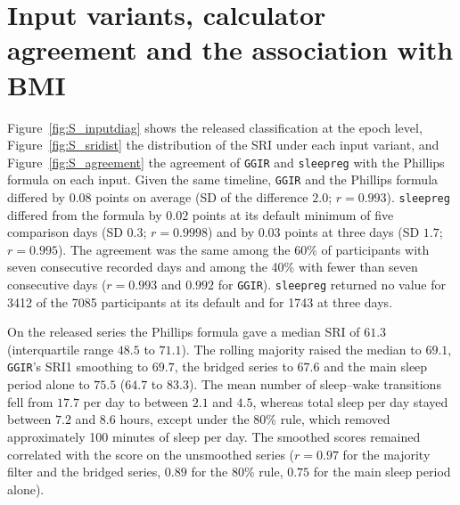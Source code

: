 \documentclass[12pt]{article}
\begin{document}
\section{Input variants, calculator agreement and the association with BMI}
\label{sec:S_inputs}
Figure~\ref{fig:S_inputdiag} shows the released classification at the epoch level, Figure~\ref{fig:S_sridist} the distribution of the SRI under each input variant, and Figure~\ref{fig:S_agreement} the agreement of \texttt{GGIR} and \texttt{sleepreg} with the Phillips formula on each input. Given the same timeline, \texttt{GGIR} and the Phillips formula differed by $0.08$ points on average (SD of the difference $2.0$; $r=0.993$). \texttt{sleepreg} differed from the formula by $0.02$ points at its default minimum of five comparison days (SD $0.3$; $r=0.9998$) and by $0.03$ points at three days (SD $1.7$; $r=0.995$). The agreement was the same among the 60\% of participants with seven consecutive recorded days and among the 40\% with fewer than seven consecutive days ($r=0.993$ and $0.992$ for \texttt{GGIR}). \texttt{sleepreg} returned no value for 3412 of the 7085 participants at its default and for 1743 at three days.

On the released series the Phillips formula gave a median SRI of $61.3$ (interquartile range $48.5$ to $71.1$). The rolling majority raised the median to $69.1$, \texttt{GGIR}'s SRI1 smoothing to $69.7$, the bridged series to $67.6$ and the main sleep period alone to $75.5$ ($64.7$ to $83.3$). The mean number of sleep--wake transitions fell from $17.7$ per day to between $2.1$ and $4.5$, whereas total sleep per day stayed between $7.2$ and $8.6$ hours, except under the 80\% rule, which removed approximately 100 minutes of sleep per day. The smoothed scores remained correlated with the score on the unsmoothed series ($r=0.97$ for the majority filter and the bridged series, $0.89$ for the 80\% rule, $0.75$ for the main sleep period alone).
\end{document}
